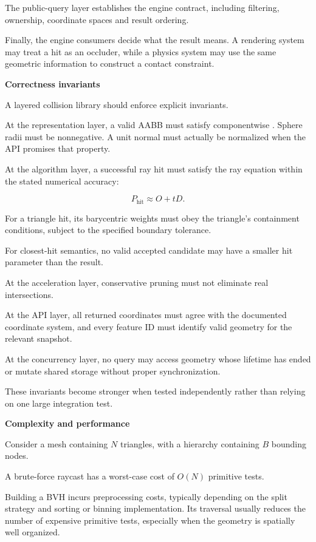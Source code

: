 The public-query layer establishes the engine contract, including filtering, ownership, coordinate spaces and result ordering.

Finally, the engine consumers decide what the result means. A rendering system may treat a hit as an occluder, while a physics system may use the same geometric information to construct a contact constraint.

\textbf{Correctness invariants}

A layered collision library should enforce explicit invariants.

At the representation layer, a valid AABB must satisfy componentwise . Sphere radii must be nonnegative. A unit normal must actually be normalized when the API promises that property.

At the algorithm layer, a successful ray hit must satisfy the ray equation within the stated numerical accuracy:

\[
P_{\text{hit}}\approx O+tD.
\]

For a triangle hit, its barycentric weights must obey the triangle's containment conditions, subject to the specified boundary tolerance.

For closest-hit semantics, no valid accepted candidate may have a smaller hit parameter than the result.

At the acceleration layer, conservative pruning must not eliminate real intersections.

At the API layer, all returned coordinates must agree with the documented coordinate system, and every feature ID must identify valid geometry for the relevant snapshot.

At the concurrency layer, no query may access geometry whose lifetime has ended or mutate shared storage without proper synchronization.

These invariants become stronger when tested independently rather than relying on one large integration test.

\textbf{Complexity and performance}

Consider a mesh containing \(N\) triangles, with a hierarchy containing \(B\) bounding nodes.

A brute-force raycast has a worst-case cost of \(O(N)\) primitive tests.

Building a BVH incurs preprocessing costs, typically depending on the split strategy and sorting or binning implementation. Its traversal usually reduces the number of expensive primitive tests, especially when the geometry is spatially well organized.

